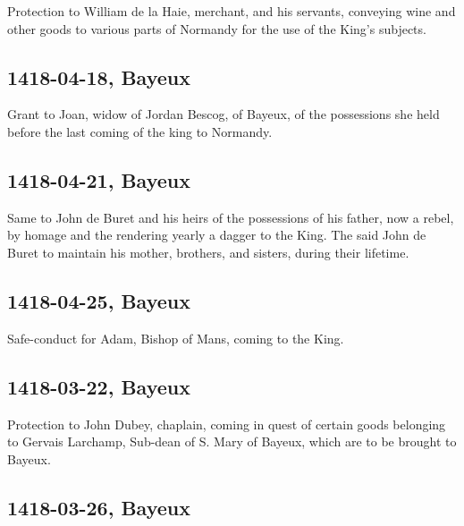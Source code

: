 \documentclass[a4paper,12pt,twoside]{book}
\begin{document}
                
                     Protection to William de la Haie, merchant, and his servants, conveying wine and other goods to various parts of Normandy for the use of the King's subjects.
                  
                
                \subsection{1418-04-18, Bayeux}
                
                
                     Grant to Joan, widow of Jordan Bescog, of Bayeux, of the possessions she held before the last coming of the king to Normandy.
                  
                
                \subsection{1418-04-21, Bayeux}
                
                
                     Same to John de Buret and his heirs of the possessions of his father, now a rebel, by homage and the rendering yearly a dagger to the King. The said John de Buret to maintain his mother, brothers, and sisters, during their lifetime.
                  
                
                \subsection{1418-04-25, Bayeux}
                
                
                     Safe-conduct for Adam, Bishop of Mans, coming to the King.
                  
                
                \subsection{1418-03-22, Bayeux}
                
                
                     Protection to John Dubey, chaplain, coming in quest of certain goods belonging to Gervais Larchamp, Sub-dean of S. Mary of Bayeux, which are to be brought to Bayeux.
                  
                
                \subsection{1418-03-26, Bayeux}
                
\end{document}
